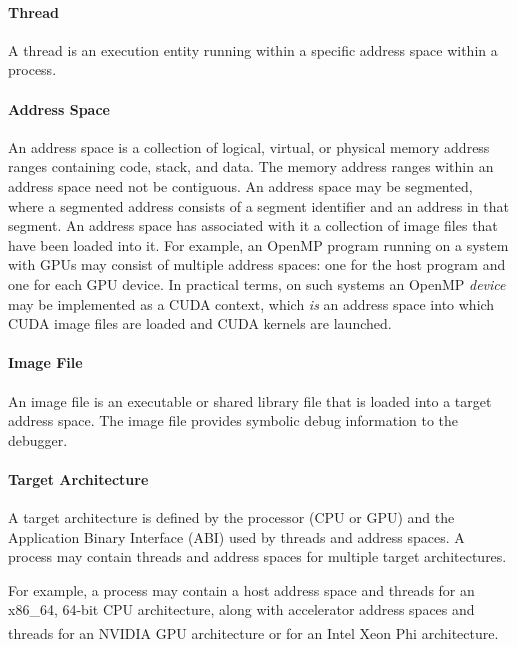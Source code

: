 \paragraph{Thread}
A thread is an execution entity running within a specific address
space within a process.

\paragraph{Address Space}
An address space is a collection of logical, virtual, or physical
memory address ranges containing code, stack, and data. 
The memory address ranges within an address space need not be
contiguous.  
An address space may be segmented, where a segmented address consists
of a segment identifier and an address in that segment. 
An address space has associated with it a collection of image files
that have been loaded into it. 
For example, an OpenMP program running on a system with GPUs may
consist of multiple address spaces: one for the host program and one
for each GPU device. 
In practical terms, on such systems an OpenMP \emph{device} may be
implemented as a CUDA context, which \emph{is} an address space into
which CUDA image files are loaded and CUDA kernels are launched.

\paragraph{Image File}
An image file is an executable or shared library file that is loaded
into a target address space.
The image file provides symbolic debug information to the debugger.

\paragraph{Target Architecture}
A target architecture is defined by the processor (CPU or GPU) and the
Application Binary Interface (ABI) used by threads and address spaces.
A process may contain threads and address spaces for multiple target
architectures.

For example, a process may contain a host address space and threads
for an x86\_64, 64-bit CPU architecture, along with accelerator
address spaces and threads for an
NVIDIA\textsuperscript{\textregistered} GPU architecture or for an
Intel\textsuperscript{\textregistered} Xeon
Phi\textsuperscript{\texttrademark} architecture.

